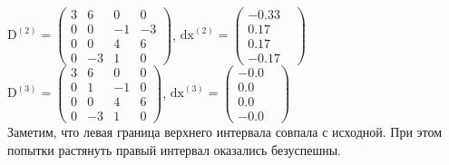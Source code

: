 \documentclass[../body.tex]{subfiles}
\begin{document}
\\$\textrm{D}^{(2)} = \begin{pmatrix}
        3& 6& 0& 0\\
        0& 0& -1& -3\\
        0& 0& 4& 6\\
        0& -3& 1& 0
        \end{pmatrix}$, $\textrm{dx}^{(2)} = \begin{pmatrix}
        -0.33&\\
        0.17&\\
        0.17&\\
        -0.17&
        \end{pmatrix}$
\\$\textrm{D}^{(3)} = \begin{pmatrix}
        3& 6& 0& 0\\
        0& 1& -1& 0\\
        0& 0& 4& 6\\
        0& -3& 1& 0
        \end{pmatrix}$, $\textrm{dx}^{(3)} = \begin{pmatrix}
        -0.0&\\
        0.0&\\
        0.0&\\
        -0.0&
        \end{pmatrix}$
\\Заметим, что левая граница верхнего интервала совпала с исходной. При этом попытки растянуть правый интервал оказались безуспешны.
\end{document}
